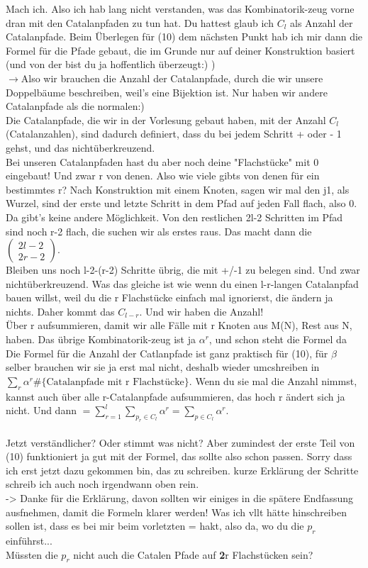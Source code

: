 \documentclass[a4paper, 11pt]{scrreprt}
\newenvironment{beweis}[1][Beweis]{\begin{trivlist}
	\item[\hskip \labelsep {\bfseries #1}]}
	{\end{trivlist}}
\begin{document}
\begin{beweis}
Mach ich. Also ich hab lang nicht verstanden, was das Kombinatorik-zeug vorne dran mit den Catalanpfaden zu tun hat. Du hattest glaub ich $C_l$ als Anzahl der Catalanpfade. Beim Überlegen für (10) dem nächsten Punkt hab ich mir dann die Formel für die Pfade gebaut, die im Grunde nur auf deiner Konstruktion basiert (und von der bist du ja hoffentlich überzeugt:) )\\
$ \longrightarrow $Also wir brauchen die Anzahl der Catalanpfade, durch die wir unsere Doppelbäume beschreiben, weil's eine Bijektion ist. Nur haben wir andere Catalanpfade als die normalen:)\\
Die Catalanpfade, die wir in der Vorlesung gebaut haben, mit der Anzahl $C_l$ (Catalanzahlen), sind dadurch definiert, dass du bei jedem Schritt + oder - 1 gehst, und das nichtüberkreuzend. \\ Bei unseren Catalanpfaden hast du aber noch deine "Flachstücke" mit 0 eingebaut! Und zwar r von denen. Also wie viele gibts von denen für ein bestimmtes r? Nach Konstruktion mit einem Knoten, sagen wir mal den j1, als Wurzel, sind der erste und letzte Schritt in dem Pfad auf jeden Fall flach, also 0. Da gibt's keine andere Möglichkeit. Von den restlichen 2l-2 Schritten im Pfad sind noch r-2 flach, die suchen wir als erstes raus. Das macht dann die $\begin{pmatrix} 2l-2\\2r-2\end{pmatrix} $.\\ 
Bleiben uns noch l-2-(r-2) Schritte übrig, die mit +/-1 zu belegen sind. Und zwar nichtüberkreuzend. Was das gleiche ist wie wenn du einen l-r-langen Catalanpfad bauen willst, weil du die r Flachstücke einfach mal ignorierst, die ändern ja nichts. Daher kommt das $ C_{l-r} $. Und wir haben die Anzahl!\\ Über r aufsummieren, damit wir alle Fälle mit r Knoten aus M(N), Rest aus N, haben. Das übrige Kombinatorik-zeug ist ja $\alpha^r  $, und schon steht die Formel da\\
Die Formel für die Anzahl der Catlanpfade ist ganz praktisch für (10), für $ \beta$ selber brauchen wir sie ja erst mal nicht, deshalb wieder umcshreiben in $ \sum_{r} \alpha^{r} \#\{ \text{Catalanpfade mit r Flachstücke} \}$. Wenn du sie mal die Anzahl nimmst, kannst auch über alle r-Catalanpfade aufsummieren, das hoch r ändert sich ja nicht. Und dann $= \sum_{r=1}^{l} \sum_{p_{r} \in C_{l}} \alpha^{r} = \sum_{p\in C_l} \alpha^r $.\\ \\
Jetzt verständlicher? Oder stimmt was nicht? Aber zumindest der erste Teil von (10) funktioniert ja gut mit der Formel, das sollte also schon passen. Sorry dass ich erst jetzt dazu gekommen bin, das zu schreiben. kurze Erklärung der Schritte schreib ich auch noch irgendwann oben rein.\\
 -> Danke für die Erklärung, davon sollten wir einiges in die spätere Endfassung ausfnehmen, damit die Formeln klarer werden! Was ich vllt hätte hinschreiben sollen ist, dass es bei mir beim vorletzten = hakt, also da, wo du die \(p_r\) einführst... \\
Müssten die \(p_r\) nicht auch die Catalen Pfade auf \textbf{2}r Flachstücken sein?


\end{beweis}
\end{document}

